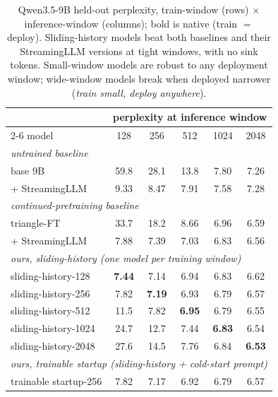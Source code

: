 \begin{table}[t]
\centering
\small
\setlength{\tabcolsep}{4pt}
\begin{tabular}{lccccc}
\toprule
& \multicolumn{5}{c}{perplexity at inference window} \\
\cmidrule(lr){2-6}
model & 128 & 256 & 512 & 1024 & 2048 \\
\midrule
\multicolumn{6}{l}{\emph{untrained baseline}}\\
base 9B            & 59.8 & 28.1 & 13.8 & 7.80 & 7.26 \\
\;+ StreamingLLM   & 9.33 & 8.47 & 7.91 & 7.58 & 7.28 \\
\multicolumn{6}{l}{\emph{continued-pretraining baseline}}\\
triangle-FT        & 33.7 & 18.2 & 8.66 & 6.96 & 6.59 \\
\;+ StreamingLLM   & 7.88 & 7.39 & 7.03 & 6.83 & 6.56 \\
\multicolumn{6}{l}{\emph{ours, sliding-history (one model per training window)}}\\
sliding-history-128       & \textbf{7.44} & 7.14 & 6.94 & 6.83 & 6.62 \\
sliding-history-256       & 7.82 & \textbf{7.19} & 6.93 & 6.79 & 6.57 \\
sliding-history-512       & 11.5 & 7.82 & \textbf{6.95} & 6.79 & 6.55 \\
sliding-history-1024      & 24.7 & 12.7 & 7.44 & \textbf{6.83} & 6.54 \\
sliding-history-2048      & 27.6 & 14.5 & 7.76 & 6.84 & \textbf{6.53} \\
\multicolumn{6}{l}{\emph{ours, trainable startup (sliding-history + cold-start prompt)}}\\
trainable startup-256        & 7.82 & 7.17 & 6.92 & 6.79 & 6.57 \\
\bottomrule
\end{tabular}
\caption{Qwen3.5-9B held-out perplexity, train-window (rows) $\times$ inference-window (columns); bold is native (train $=$ deploy). Sliding-history models beat both baselines and their StreamingLLM versions at tight windows, with no sink tokens. Small-window models are robust to any deployment window; wide-window models break when deployed narrower (\emph{train small, deploy anywhere}).}
\label{tab:matrix}
\end{table}
